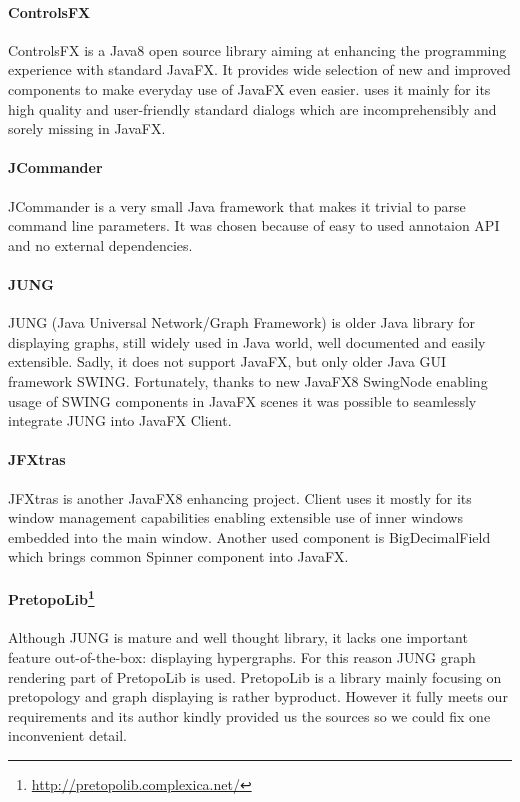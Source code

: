 
\paragraph{ControlsFX}
ControlsFX is a Java8 open source library aiming at enhancing the programming
experience with standard JavaFX. It provides wide selection of new and improved
components to make everyday use of JavaFX even easier. \textan{} uses it mainly
for its high quality and user-friendly standard dialogs which are
incomprehensibly and sorely missing in JavaFX.

\paragraph{JCommander}
JCommander is a very small Java framework that makes it trivial to parse command
line parameters. It was chosen because of easy to used annotaion API and no
external dependencies.

\paragraph{JUNG}
JUNG (Java Universal Network/Graph Framework) is older Java library for
displaying graphs, still widely used in Java world, well documented and easily
extensible. Sadly, it does not support JavaFX, but only older Java GUI framework
SWING. Fortunately, thanks to new JavaFX8 SwingNode enabling usage of SWING
components in JavaFX scenes it was possible to seamlessly integrate JUNG into
JavaFX \textan{} Client.

\paragraph{JFXtras}
JFXtras is another JavaFX8 enhancing project. \textan{} Client uses it mostly
for its window management capabilities enabling extensible use of inner windows
embedded into the main window. Another used component is BigDecimalField which
brings common Spinner component into JavaFX.


\paragraph{PretopoLib\footnote{\url{http://pretopolib.complexica.net/}}}
Although JUNG is mature and well thought library, it lacks one important feature
out-of-the-box: displaying hypergraphs. For this reason JUNG graph rendering
part of PretopoLib is used. PretopoLib is a library mainly focusing on
pretopology and graph displaying is rather byproduct. However it fully meets our
requirements and its author kindly provided us the sources so we could fix one
inconvenient detail.

